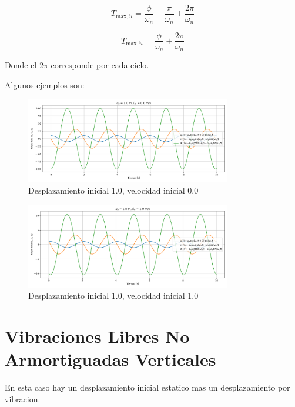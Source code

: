\documentclass{article}  %
\begin{document}
\begin{equation}
    T_{\text{max},\dot{u}} = \frac{\phi}{\omega_n} + \frac{\pi}{\omega_n} + \frac{2\pi}{\omega_n}
\end{equation}

\begin{equation}
    T_{\text{max},\ddot{u}} = \frac{\phi}{\omega_n} + \frac{2\pi}{\omega_n}
\end{equation}

Donde el $2\pi$ corresponde por cada ciclo.

Algunos ejemplos son:

\begin{figure}[H]
    \centering
    \includegraphics[width=0.8\textwidth]{GRAFICOS/sis_no_amortiguado_u0_1.0_v0_0.0.png}
    \caption{Desplazamiento inicial 1.0, velocidad inicial 0.0}
    \label{fig:ejemplo1}
\end{figure}

\begin{figure}[H]
    \centering
    \includegraphics[width=0.8\textwidth]{GRAFICOS/sis_no_amortiguado_u0_1.0_v0_1.0.png}
    \caption{Desplazamiento inicial 1.0, velocidad inicial 1.0}
    \label{fig:ejemplo1}
\end{figure}

\section{Vibraciones Libres No Armortiguadas Verticales}

En esta caso hay un desplazamiento inicial estatico mas un desplazamiento por vibracion.
\end{document}

